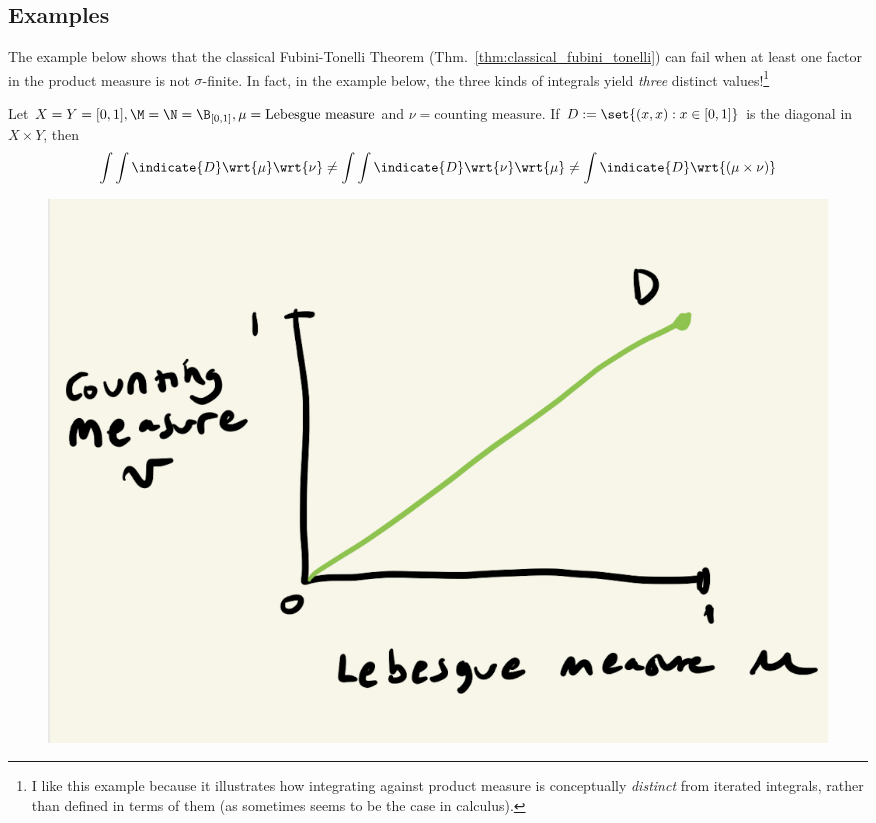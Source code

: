 \documentclass{article} %
\begin{document}
\subsection{Examples}

The example below shows that the classical Fubini-Tonelli Theorem (Thm.~\ref{thm:classical_fubini_tonelli}) can fail when at least one factor in the product measure is not $\sigma$-finite.  In fact, in the example below, the three kinds of integrals yield \textit{three} distinct values!\footnote{I like this example because it illustrates how integrating against product measure is conceptually \textit{distinct} from iterated integrals, rather than defined in terms of them (as sometimes seems to be the case in calculus).} %
  
\begin{example}{}
\cite[Exercise 2.46, pp.68]{folland1999real} Let $X=Y=[0,1], \M =\N = \B_{[0,1]}, \mu = \text{Lebesgue measure}$ and $\nu = \text{counting measure}$.  If $D:=\set{(x,x) : x \in [0,1]}$ is the diagonal in $X \times Y$, then 
\[\int \int \indicate{D} \wrt{\mu} \wrt{\nu}\neq \int \int \indicate{D} \wrt{\nu} \wrt{\mu} \neq \int \indicate{D} \wrt{(\mu \times \nu)} \]

\begin{figure}[H]
\centering 
\includegraphics[width=.4\textwidth]{images/lebesgue_counting_measure_on_unit_square_diagonal}	
\end{figure}
\label{ex:lebesgue_counting_measure_on_the_unit_square_diagonal}
\end{example}
\end{document}
